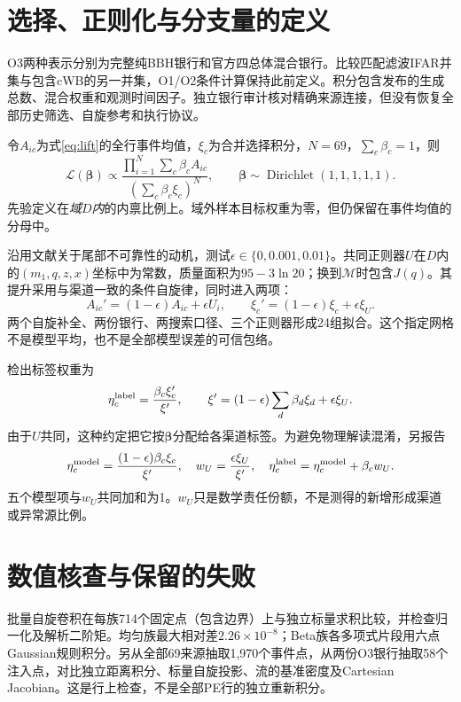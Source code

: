 \section{选择、正则化与分支量的定义}
O3两种表示分别为完整纯BBH银行和官方四总体混合银行。比较匹配滤波IFAR并集与包含cWB的另一并集，O1/O2条件计算保持此前定义。积分包含发布的生成总数、混合权重和观测时间因子。独立银行审计核对精确来源连接，但没有恢复全部历史筛选、自旋参考和执行协议。

令$A_{ic}$为式\eqref{eq:lift}的全行事件均值，$\xi_c$为合并选择积分，$N=69$，$\sum_c\beta_c=1$，则
\begin{equation}\label{eq:likelihood}
\mathcal L(\bm\beta)\propto
\frac{\prod_{i=1}^N\sum_c\beta_c A_{ic}}
{\left(\sum_c\beta_c\xi_c\right)^N},\qquad
\bm\beta\sim\operatorname{Dirichlet}(1,1,1,1,1).
\end{equation}
先验定义在\emph{域$D$内}的内禀比例上。域外样本目标权重为零，但仍保留在事件均值的分母中。

沿用文献\cite{colloms}关于尾部不可靠性的动机，测试$\epsilon\in\{0,0.001,0.01\}$。共同正则器$U$在$D$内的$(m_1,q,z,x)$坐标中为常数，质量面积为$95-3\ln20$；换到$\mathcal M$时包含$J(q)$。其提升采用与渠道一致的条件自旋律，同时进入两项：
\begin{equation}\label{eq:regularization}
A_{ic}'=(1-\epsilon)A_{ic}+\epsilon U_i,
\qquad \xi_c'=(1-\epsilon)\xi_c+\epsilon\xi_U.
\end{equation}
两个自旋补全、两份银行、两搜索口径、三个正则器形成24组拟合。这个指定网格不是模型平均，也不是全部模型误差的可信包络。

检出标签权重为
\begin{equation}\label{eq:label}
\eta_c^{\rm label}=\frac{\beta_c\xi_c'}{\xi'},\qquad
\xi'=(1-\epsilon)\sum_d\beta_d\xi_d+\epsilon\xi_U.
\end{equation}
由于$U$共同，这种约定把它按$\bm\beta$分配给各渠道标签。为避免物理解读混淆，另报告
\begin{equation}\label{eq:decomposition}
\eta_c^{\rm model}=\frac{(1-\epsilon)\beta_c\xi_c}{\xi'},\quad
w_U=\frac{\epsilon\xi_U}{\xi'},\quad
\eta_c^{\rm label}=\eta_c^{\rm model}+\beta_c w_U.
\end{equation}
五个模型项与$w_U$共同加和为1。$w_U$只是数学责任份额，不是测得的新增形成渠道或异常源比例。

\section{数值核查与保留的失败}
批量自旋卷积在每族714个固定点（包含边界）上与独立标量求积比较，并检查归一化及解析二阶矩。均匀族最大相对差$2.26\times10^{-8}$；Beta族各多项式片段用六点Gaussian规则积分。另从全部69来源抽取1,970个事件点，从两份O3银行抽取58个注入点，对比独立距离积分、标量自旋投影、流的基准密度及Cartesian Jacobian。这是行上检查，不是全部PE行的独立重新积分。

